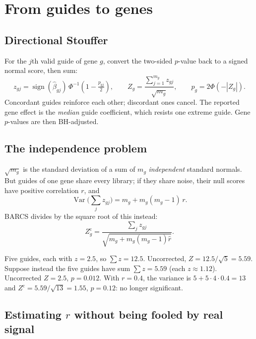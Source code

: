 \documentclass[11pt]{article}
\newcommand{\Var}{\operatorname{Var}}
\begin{document}
\section{From guides to genes}

\subsection{Directional Stouffer}

For the $j$th valid guide of gene $g$, convert the two-sided $p$-value back to
a signed normal score, then sum:
\begin{equation}
z_{gj}=\operatorname{sign}(\hat\beta_{gj})\,\Phi^{-1}\!\left(1-\tfrac{p_{gj}}{2}\right),
\qquad
Z_g=\frac{\sum_{j=1}^{m_g}z_{gj}}{\sqrt{m_g}},\qquad p_g=2\Phi(-|Z_g|).
\end{equation}
Concordant guides reinforce each other; discordant ones cancel.  The reported
gene effect is the \emph{median} guide coefficient, which resists one extreme
guide.  Gene $p$-values are then BH-adjusted.

\subsection{The independence problem}

$\sqrt{m_g}$ is the standard deviation of a sum of $m_g$ \emph{independent}
standard normals.  But guides of one gene share every library; if they share
noise, their null scores have positive correlation $r$, and
\begin{equation}
\Var\Big(\sum_j z_{gj}\Big)=m_g+m_g(m_g-1)\,r .
\end{equation}
BARCS divides by the square root of this instead:
\begin{equation}
Z_g^{\text{c}}=\frac{\sum_{j}z_{gj}}{\sqrt{m_g+m_g(m_g-1)\hat r}} .
\end{equation}

\begin{example}
Five guides, each with $z=2.5$, so $\sum z=12.5$.  Uncorrected,
$Z=12.5/\sqrt5=5.59$.  Suppose instead the five guides have sum
$\sum z=5.59$ (each $z\approx1.12$).  Uncorrected $Z=2.5$, $p=0.012$.
With $r=0.4$, the variance is $5+5\cdot4\cdot0.4=13$ and
$Z^{\text{c}}=5.59/\sqrt{13}=1.55$, $p=0.12$: no longer significant.
\end{example}

\subsection{Estimating $r$ without being fooled by real signal}
\end{document}
